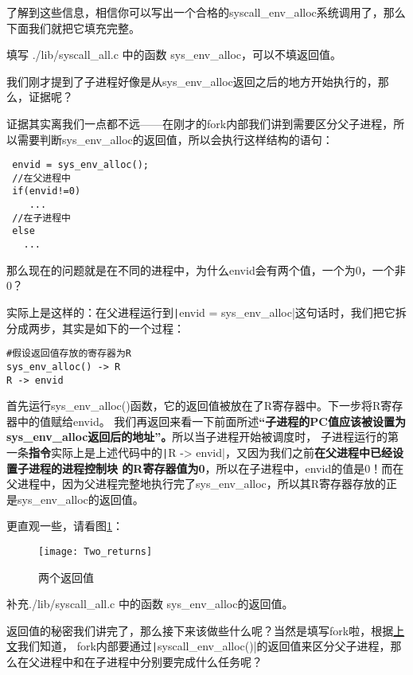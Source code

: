 了解到这些信息，相信你可以写出一个合格的syscall\_env\_alloc系统调用了，那么下面我们就把它填充完整。

\begin{exercise}
填写 ./lib/syscall\_all.c 中的函数 sys\_env\_alloc，可以不填返回值。
\end{exercise}

我们刚才提到了子进程好像是从sys\_env\_alloc返回之后的地方开始执行的，那么，证据呢？

证据其实离我们一点都不远——在刚才的fork内部我们讲到需要区分父子进程，所以需要判断sys\_env\_alloc的返回值，所以会执行这样结构的语句：
\begin{verbatim}
 envid = sys_env_alloc();
 //在父进程中
 if(envid!=0)
    ...
 //在子进程中
 else
   ...
\end{verbatim}

那么现在的问题就是在不同的进程中，为什么envid会有两个值，一个为0，一个非0？

实际上是这样的：在父进程运行到\texttt|envid = sys_env_alloc|这句话时，我们把它拆分成两步，其实是如下的一个过程：
\begin{verbatim}
#假设返回值存放的寄存器为R
sys_env_alloc() -> R
R -> envid
\end{verbatim}

首先运行sys\_env\_alloc()函数，它的返回值被放在了R寄存器中。下一步将R寄存器中的值赋给envid。
我们再返回来看一下前面所述\textbf{“子进程的PC值应该被设置为sys\_env\_alloc返回后的地址”。}所以当子进程开始被调度时，
子进程运行的第一条\textbf{指令}实际上是上述代码中的\texttt|R -> envid|，又因为我们之前\textbf{在父进程中已经设置子进程的进程控制块
的R寄存器值为0}，所以在子进程中，envid的值是0！而在父进程中，因为父进程完整地执行完了sys\_env\_alloc，所以其R寄存器存放的正是sys\_env\_alloc的返回值。

更直观一些，请看图\ref{fig:Two_returns}：

\begin{figure}[htbp]
  \centering
  \texttt{[image: Two\_returns]}
  \caption{两个返回值}\label{fig:Two_returns}
\end{figure}

\begin{exercise}
补充./lib/syscall\_all.c 中的函数 sys\_env\_alloc的返回值。
\end{exercise}

返回值的秘密我们讲完了，那么接下来该做些什么呢？当然是填写fork啦，根据\hyperref[fork区分父子进程]{上文}我们知道，
fork内部要通过\texttt|syscall_env_alloc()|的返回值来区分父子进程，那么在父进程中和在子进程中分别要完成什么任务呢？

